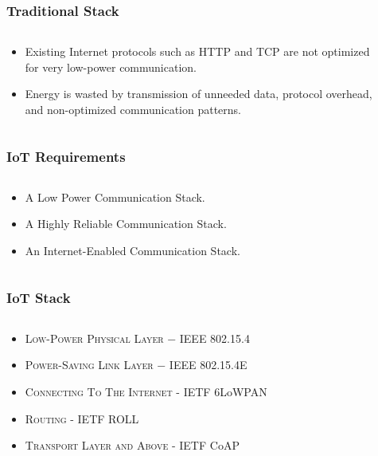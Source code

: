 \documentclass{beamer}
\begin{document}
\begin{frame}
	\frametitle{Traditional Stack}
	\begin{columns}[c]
		\begin{column}{30cm}
			\vspace{.1cm}
			\begin{itemize}
				\justifying
				\item Existing Internet protocols such as HTTP and TCP are not optimized\\
				for very \textcolor{TextOrange}{low-power communication}.
				\item Energy is wasted by transmission of \textcolor{TextGreen}{unneeded data},
				\textcolor{TextGreen}{protocol overhead},\\
				and \textcolor{TextGreen}{non-optimized communication patterns}.
			\end{itemize}
		\end{column}
	\end{columns}
\end{frame}

\begin{frame}
	\frametitle{IoT Requirements}
	\begin{columns}[c]
		\begin{column}{30cm}
			\vspace{.1cm}
			\begin{itemize}
				\justifying
				\item A Low Power Communication Stack.
				\item A Highly Reliable Communication Stack.
				\item An Internet-Enabled Communication Stack.
			\end{itemize}
		\end{column}
	\end{columns}
\end{frame}

\begin{frame}
	\frametitle{IoT Stack}
	\begin{columns}[c]
		\begin{column}{30cm}
			\vspace{.1cm}
			\begin{itemize}
				\justifying
				\item \textsc{Low-Power Physical Layer} − \textcolor{TextOrange}{IEEE 802.15.4}
				\item \textsc{Power-Saving Link Layer} − \textcolor{TextOrange}{IEEE 802.15.4E}
				\item \textsc{Connecting To The Internet} - \textcolor{TextGreen}{IETF 6LoWPAN}
				\item \textsc{Routing} - \textcolor{TextGreen}{IETF ROLL}
				\item \textsc{Transport Layer and Above} - \textcolor{TextGreen}{IETF CoAP}
			\end{itemize}
		\end{column}
	\end{columns}
\end{frame}
\end{document}
